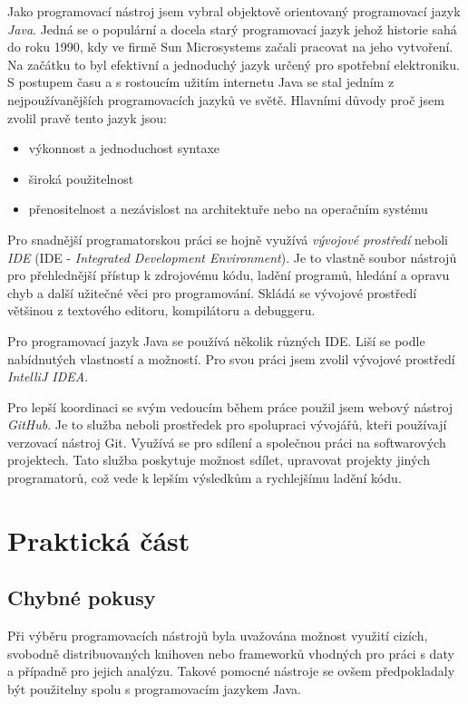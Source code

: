 \documentclass[a4paper,12pt,twoside]{scrreprt}
\begin{document}
Jako programovací nástroj jsem vybral objektově orientovaný programovací jazyk \textit{Java}. Jedná se o populární a docela starý programovací jazyk jehož historie sahá do roku 1990, kdy ve firmě Sun Microsystems začali pracovat na jeho vytvoření. Na začátku to byl efektivní a jednoduchý jazyk určený pro spotřební elektroniku. S postupem času a s rostoucím užitím internetu Java se stal jedním z nejpoužívanějších programovacích jazyků ve světě. Hlavními důvody proč jsem zvolil pravě tento jazyk jsou: 

\begin{itemize}
\item výkonnost a jednoduchost syntaxe
\item široká použitelnost
\item přenositelnost a nezávislost na architektuře nebo na operačním systému
\end{itemize} 

Pro snadnější programatorskou práci se hojně využívá \textit{vývojové prostředí} neboli \textit{IDE} (IDE - \textit{Integrated Development Environment}). Je to vlastně soubor nástrojů pro přehlednější přístup k zdrojovému kódu, ladění programů, hledání a opravu chyb a další užitečné věci pro programování. Skládá se vývojové prostředí většinou z textového editoru, kompilátoru a debuggeru. 

Pro programovací jazyk Java se používá několik různých IDE. Liší se podle nabídnutých vlastností a možností. Pro svou práci jsem zvolil vývojové prostředí \textit{IntelliJ IDEA}. 

Pro lepší koordinaci se svým vedoucím během práce použil jsem webový nástroj \textit{GitHub}. Je to služba neboli prostředek pro spolupraci vývojářů, kteři používají verzovací nástroj Git. Využívá se pro sdílení a společnou práci na softwarových projektech. Tato služba poskytuje možnost sdílet, upravovat projekty jiných programatorů, což vede k lepším výsledkům a rychlejšímu ladění kódu. 

\chapter{Praktická část}
\section{Chybné pokusy}
\vspace{0.5cm}
Při výběru programovacích nástrojů byla uvažována možnost využití cizích, svobodně distribuovaných knihoven nebo frameworků vhodných pro práci s daty a případně pro jejich analýzu. Takové pomocné nástroje se ovšem předpokladaly být použitelny spolu s programovacím jazykem Java. 
\end{document}
